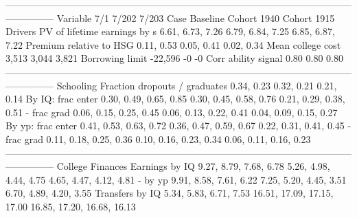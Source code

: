 ---------------------------------------------------------------------------------------------------------------------------
                              Variable                          7/1                       7/202                       7/203
                                  Case                     Baseline                 Cohort 1940                 Cohort 1915
                               Drivers                                                                                     
          PV of lifetime earnings by s             6.61, 6.73, 7.26            6.79, 6.84, 7.25            6.85, 6.87, 7.22
               Premium relative to HSG                   0.11, 0.53                  0.05, 0.41                  0.02, 0.34
                     Mean college cost                        3,513                       3,044                       3,821
                       Borrowing limit                      -22,596                          -0                          -0
                   Corr ability signal                         0.80                        0.80                        0.80
---------------------------------------------------------------------------------------------------------------------------
                             Schooling                                                                                     
         Fraction dropouts / graduates                   0.34, 0.23                  0.32, 0.21                  0.21, 0.14
                     By IQ: frac enter       0.30, 0.49, 0.65, 0.85      0.30, 0.45, 0.58, 0.76      0.21, 0.29, 0.38, 0.51
                           - frac grad       0.06, 0.15, 0.25, 0.45      0.06, 0.13, 0.22, 0.41      0.04, 0.09, 0.15, 0.27
                     By yp: frac enter       0.41, 0.53, 0.63, 0.72      0.36, 0.47, 0.59, 0.67      0.22, 0.31, 0.41, 0.45
                           - frac grad       0.11, 0.18, 0.25, 0.36      0.10, 0.16, 0.23, 0.34      0.06, 0.11, 0.16, 0.23
---------------------------------------------------------------------------------------------------------------------------
                      College Finances                                                                                     
                        Earnings by IQ       9.27, 8.79, 7.68, 6.78      5.26, 4.98, 4.44, 4.75      4.65, 4.47, 4.12, 4.81
                               - by yp       9.91, 8.58, 7.61, 6.22      7.25, 5.20, 4.45, 3.51      6.70, 4.89, 4.20, 3.55
                       Transfers by IQ       5.34, 5.83, 6.71, 7.53  16.51, 17.09, 17.15, 17.00  16.85, 17.20, 16.68, 16.13
